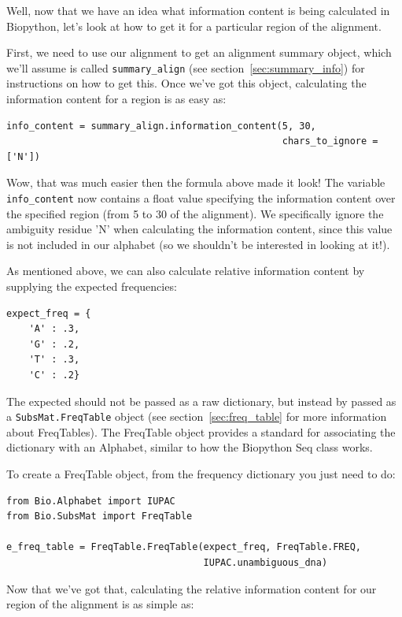 \documentclass{report}
\begin{document}
Well, now that we have an idea what information content is being calculated in Biopython, let's look at how to get it for a particular region of the alignment.

First, we need to use our alignment to get an alignment summary object, which we'll assume is called \verb|summary_align| (see section~\ref{sec:summary_info}) for instructions on how to get this. Once we've got this object, calculating the information content for a region is as easy as:

\begin{verbatim}
info_content = summary_align.information_content(5, 30,
                                                 chars_to_ignore = ['N'])
\end{verbatim}

Wow, that was much easier then the formula above made it look! The variable \verb|info_content| now contains a float value specifying the information content over the specified region (from 5 to 30 of the alignment). We specifically ignore the ambiguity residue 'N' when calculating the information content, since this value is not included in our alphabet (so we shouldn't be interested in looking at it!).

As mentioned above, we can also calculate relative information content by supplying the expected frequencies:

\begin{verbatim}
expect_freq = {
    'A' : .3,
    'G' : .2,
    'T' : .3,
    'C' : .2}
\end{verbatim}

The expected should not be passed as a raw dictionary, but instead by passed as a \verb|SubsMat.FreqTable| object (see section~\ref{sec:freq_table} for more information about FreqTables). The FreqTable object provides a standard for associating the dictionary with an Alphabet, similar to how the Biopython Seq class works.

To create a FreqTable object, from the frequency dictionary you just need to do:

\begin{verbatim}
from Bio.Alphabet import IUPAC
from Bio.SubsMat import FreqTable

e_freq_table = FreqTable.FreqTable(expect_freq, FreqTable.FREQ,
                                   IUPAC.unambiguous_dna)
\end{verbatim}

Now that we've got that, calculating the relative information content for our region of the alignment is as simple as:
\end{document}
